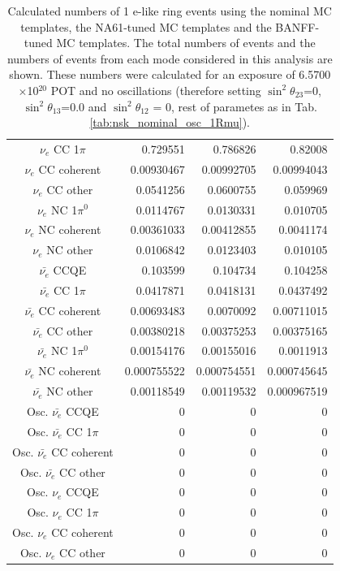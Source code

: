 \begin{table}
\begin{tabular}{| c |  D{.}{.}{-1} |  D{.}{.}{-1} |  D{.}{.}{-1} | }
$\nu_e$ CC 1$\pi$ & 0.729551 & 0.786826 & 0.82008 \\ 
$\nu_e$ CC coherent & 0.00930467 & 0.00992705 & 0.00994043 \\ 
$\nu_e$ CC other & 0.0541256 & 0.0600755 & 0.059969 \\ 
$\nu_e$ NC 1$\pi^0$ & 0.0114767 & 0.0130331 & 0.010705 \\ 
$\nu_e$ NC coherent & 0.00361033 & 0.00412855 & 0.0041174 \\ 
$\nu_e$ NC other & 0.0106842 & 0.0123403 & 0.010105 \\ 
$\bar{\nu_e}$ CCQE & 0.103599 & 0.104734 & 0.104258 \\ 
$\bar{\nu_e}$ CC 1$\pi$ & 0.0417871 & 0.0418131 & 0.0437492 \\ 
$\bar{\nu_e}$ CC coherent & 0.00693483 & 0.0070092 & 0.00711015 \\ 
$\bar{\nu_e}$ CC other & 0.00380218 & 0.00375253 & 0.00375165 \\ 
$\bar{\nu_e}$ NC 1$\pi^0$ & 0.00154176 & 0.00155016 & 0.0011913 \\ 
$\bar{\nu_e}$ NC coherent & 0.000755522 & 0.000754551 & 0.000745645 \\ 
$\bar{\nu_e}$ NC other & 0.00118549 & 0.00119532 & 0.000967519 \\ 
Osc. $\bar{\nu_e}$ CCQE & 0 & 0 & 0 \\ 
Osc. $\bar{\nu_e}$ CC 1$\pi$ & 0 & 0 & 0 \\ 
Osc. $\bar{\nu_e}$ CC coherent & 0 & 0 & 0 \\ 
Osc. $\bar{\nu_e}$ CC other & 0 & 0 & 0 \\ 
Osc. $\nu_e$ CCQE & 0 & 0 & 0 \\ 
Osc. $\nu_e$ CC 1$\pi$ & 0 & 0 & 0 \\ 
Osc. $\nu_e$ CC coherent & 0 & 0 & 0 \\ 
Osc. $\nu_e$ CC other & 0 & 0 & 0 \\ 
\hline
\end{tabular}
\caption{
Calculated numbers of 1 e-like ring events using the nominal MC templates, the NA61-tuned MC templates
and the BANFF-tuned MC templates.
The total numbers of events and the numbers of events from each mode considered in this analysis are shown.
These numbers were calculated for an exposure of 6.5700$\times$10$^{20}$ POT
and  no oscillations (therefore setting $\sin^{2}\theta_{23}$=0,
$\sin^{2}\theta_{13}$=0.0 and $\sin^{2}\theta_{12}$ = 0, rest of parametes as in Tab. \ref{tab:nsk_nominal_osc_1Rmu}).
}
\label{tab:nsk_nominal_no_osc_1Re}
\end{table}
